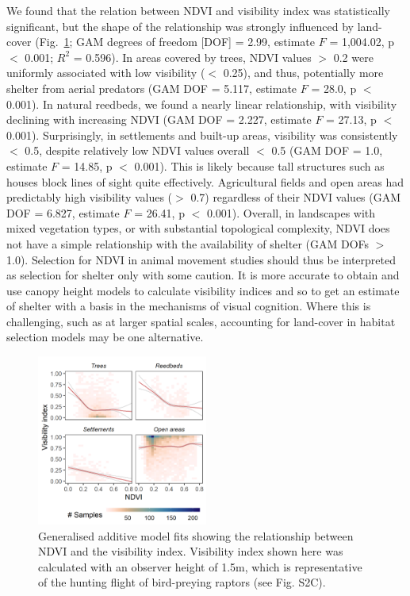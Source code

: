 We found that the relation between NDVI and visibility index was statistically significant, but the shape of the relationship was strongly influenced by land-cover (Fig.~\ref{fig:vis-ndvi}; GAM degrees of freedom [DOF] = 2.99, estimate $F$ = 1,004.02, p $<$ 0.001; $R^2$ = 0.596).
In areas covered by trees, NDVI values $>$ 0.2 were uniformly associated with low visibility ($<$ 0.25), and thus, potentially more shelter from aerial predators (GAM DOF = 5.117, estimate $F$ = 28.0, p $<$ 0.001).
In natural reedbeds, we found a nearly linear relationship, with visibility declining with increasing NDVI (GAM DOF = 2.227, estimate $F$ = 27.13, p $<$ 0.001).
Surprisingly, in settlements and built-up areas, visibility was consistently $<$ 0.5, despite relatively low NDVI values overall $<$ 0.5 (GAM DOF = 1.0, estimate $F$ = 14.85, p $<$ 0.001).
This is likely because tall structures such as houses block lines of sight quite effectively.
Agricultural fields and open areas had predictably high visibility values ($>$ 0.7) regardless of their NDVI values (GAM DOF = 6.827, estimate $F$ = 26.41, p $<$ 0.001).
Overall, in landscapes with mixed vegetation types, or with substantial topological complexity, NDVI does not have a simple relationship with the availability of shelter (GAM DOFs $>$ 1.0).
Selection for NDVI in animal movement studies should thus be interpreted as selection for shelter only with some caution.
It is more accurate to obtain and use canopy height models to calculate visibility indices and so to get an estimate of shelter with a basis in the mechanisms of visual cognition.
Where this is challenging, such as at larger spatial scales, accounting for land-cover in habitat selection models may be one alternative.

\begin{figure}
    \centering
    \includegraphics[width=0.5\textwidth]{figures/holeybirds/fig_spm_03}
    \caption{Generalised additive model fits showing the relationship between NDVI and the visibility index. Visibility index shown here was calculated with an observer height of 1.5m, which is representative of the hunting flight of bird-preying raptors (see Fig. S2C).}
    \label{fig:vis-ndvi}
\end{figure}

